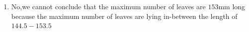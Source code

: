 \documentclass[12pt,twocolumn]{IEEEtran}
\begin{document}
\begin{enumerate}[label=(\roman*)]
\begin{figure}[ht!]
	\end{figure}
	\item No,we cannot conclude that the maximum number of leaves are $153$mm long because the maximum number of leaves are lying in-between the length of $144.5-153.5$


\end{enumerate}
\end{document}
